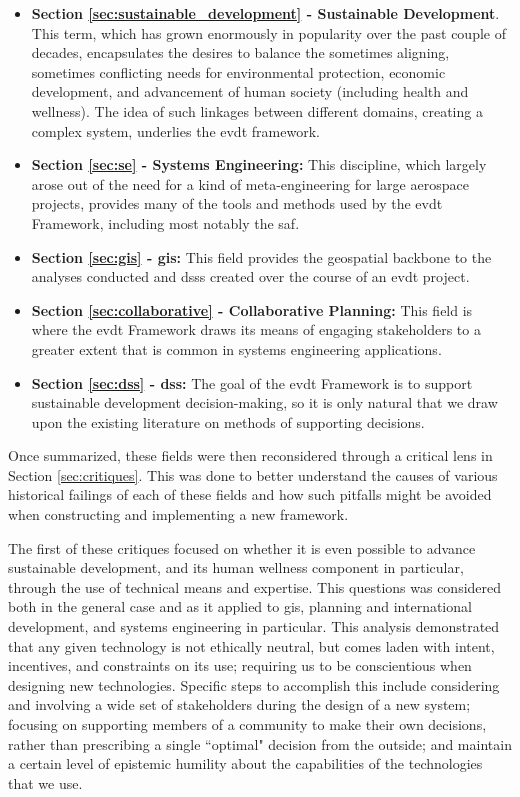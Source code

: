 \begin{itemize}[itemsep=0pt,parsep=0pt]
	\item{\textbf{Section \ref{sec:sustainable_development} - Sustainable Development}. This term, which has grown enormously in popularity over the past couple of decades, encapsulates the desires to balance the sometimes aligning, sometimes conflicting needs for environmental protection, economic development, and advancement of human society (including health and wellness). The idea of such linkages between different domains, creating a complex system, underlies the \ac{evdt} framework.}
	\item{\textbf{Section \ref{sec:se} - Systems Engineering:} This discipline, which largely arose out of the need for a kind of meta-engineering for large aerospace projects, provides many of the tools and methods used by the \ac{evdt} Framework, including most notably the \acf{saf}.}
	\item{\textbf{Section \ref{sec:gis} - \acf{gis}:} This field provides the geospatial backbone to the analyses conducted and \acp{dss} created over the course of an \ac{evdt} project.} 
	\item{\textbf{Section \ref{sec:collaborative} - Collaborative Planning:} This field is where the \ac{evdt} Framework draws its means of engaging stakeholders to a greater extent that is common in systems engineering applications.}
	\item{\textbf{Section \ref{sec:dss} - \acf{dss}:} The goal of the \ac{evdt} Framework is to support sustainable development decision-making, so it is only natural that we draw upon the existing literature on methods of supporting decisions.}
\end{itemize}

Once summarized, these fields were then reconsidered through a critical lens in Section \ref{sec:critiques}. This was done to better understand the causes of various historical failings of each of these fields and how such pitfalls might be avoided when constructing and implementing a new framework. 

The first of these critiques focused on whether it is even possible to advance sustainable development, and its human wellness component in particular, through the use of technical means and expertise. This questions was considered both in the general case and as it applied to \ac{gis}, planning and international development, and systems engineering in particular. This analysis demonstrated that any given technology is not ethically neutral, but comes laden with intent, incentives, and constraints on its use; requiring us to be conscientious when designing new technologies. Specific steps to accomplish this include considering and involving a wide set of stakeholders during the design of a new system; focusing on supporting members of a community to make their own decisions, rather than prescribing a single ``optimal" decision from the outside; and maintain a certain level of epistemic humility about the capabilities of the technologies that we use.

